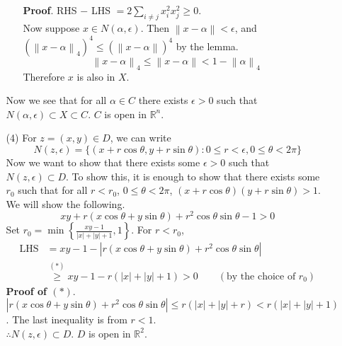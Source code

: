 \documentclass[12pt]{report}
\newcommand{\bb}[1]{\mathbb{#1}}
\newcommand{\norm}[1]{\left\lVert#1\right\rVert}
\newcommand{\abs}[1]{\left|#1\right|}
\newcommand{\ds}{\displaystyle}
\begin{document}
\begin{enumerate}
\begin{enumerate}
\begin{enumerate}
		\textbf{Proof}. RHS $-$ LHS $= 2 \sum_{i\neq j} x_i^2x_j^2 \geq 0$.\\
		Now suppose $x\in N(\alpha, \epsilon)$. Then $ \norm{x-\alpha} < \epsilon$, and $(\norm{x-\alpha}_4)^4 \leq \left(\norm{x-\alpha}\right)^4$ by the lemma.$$\norm{x-\alpha}_4 \leq \norm{x-\alpha} < 1-\norm{\alpha}_4$$
		Therefore $x$ is also in $X$.
	\end{enumerate}
	Now we see that for all $\alpha \in C$ there exists $\epsilon > 0$ such that  $N(\alpha, \epsilon) \subset X\subset C$. $C$ is open in $\bb{R}^n$.
	\item[(4)] For $z = (x, y)\in D$, we can write $$N(z, \epsilon) = \{(x +r\cos\theta, y + r\sin\theta) : 0\leq r<\epsilon, 0\leq \theta < 2\pi \}$$
	Now we want to show that there exists some $\epsilon>0$ such that $N(z, \epsilon) \subset D$. To show this, it is enough to show that there exists some $r_0$ such that for all $r < r_0$, $0\leq \theta<2\pi$, $(x+r\cos\theta)(y + r\sin\theta) > 1$. We will show the following.
	$$xy + r(x\cos\theta + y\sin\theta) + r^2\cos\theta\sin\theta -1 >0$$
	Set $\ds r_0 = \min\left\{ \frac{xy-1}{\abs{x}+\abs{y} + 1}, 1 \right\}$. For $r<r_0$,
	$$\begin{aligned}
		\text{LHS} &= xy - 1  - \abs{r(x\cos\theta + y\sin\theta) + r^2\cos\theta\sin\theta}\\ &\overset{(*)}{\geq} xy-1-r(\abs{x}+\abs{y} + 1) > 0\qquad  (\text{by the choice of } r_0)
	\end{aligned}$$
	\textbf{Proof of $(*)$}. $\abs{r(x\cos\theta + y\sin\theta) + r^2\cos\theta\sin\theta} \leq r(\abs{x}+\abs{y} +r) < r(\abs{x}+\abs{y}+1)$. The last inequality is from $r < 1$.\\
	$\therefore N(z, \epsilon) \subset D$. $D$ is open in $\bb{R}^2$. 
\end{enumerate}


\end{enumerate}
\end{document}
